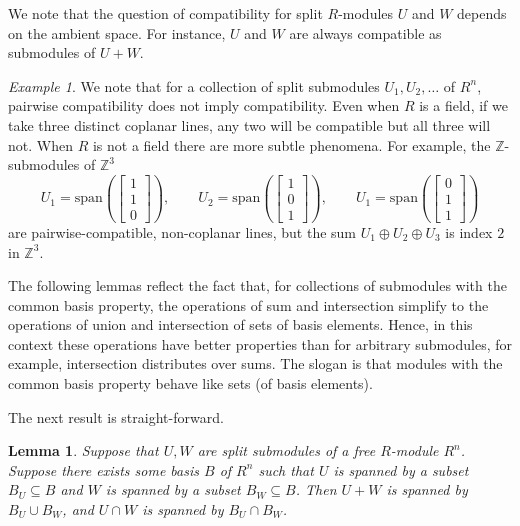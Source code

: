 \documentclass[a4paper]{amsart}
\newcommand{\Z}{\mathbb{Z}}
\numberwithin{theoremcounter}{section}
\newtheorem{lemma}[lemmaauto]{Lemma}
\theoremstyle{definition}
\theoremstyle{remark}
\newtheorem{example}[exampleauto]{Example}
\begin{document}
We note that the question of compatibility for split $R$-modules $U$ and $W$ depends on the ambient space. For instance, $U$ and $W$ are always compatible as submodules of $U+W$. 

\begin{example} We note that for a collection of split submodules $U_1, U_2, \dots$ of $R^n$, pairwise compatibility does not imply compatibility. Even when $R$ is a field, if we take three distinct coplanar lines, any two will be compatible but all three will not. When $R$ is not a field there are more subtle phenomena. For example, the $\Z$-submodules of $\Z^3$
$$ U_1 = \mathrm{span} \left( \begin{bmatrix} 1\\ 1 \\0  \end{bmatrix} \right),   \qquad U_2 = \mathrm{span} \left( \begin{bmatrix} 1\\0 \\1  \end{bmatrix} \right),  \qquad U_1 = \mathrm{span} \left( \begin{bmatrix} 0\\ 1 \\1  \end{bmatrix} \right)$$ 
are pairwise-compatible, non-coplanar lines, but the sum $U_1 \oplus U_2 \oplus U_3$ is index $2$ in $\Z^3$. 
\end{example} 

The following lemmas reflect the fact that, for collections of submodules with the common basis property, the operations of sum and intersection simplify to the operations of union and intersection of sets of basis elements. Hence, in this context these operations have better properties than for arbitrary submodules, for example, intersection distributes over sums. The slogan is that modules with the common basis property behave like sets (of basis elements).

The next result is straight-forward. 

\begin{lemma}  \label{CommonBasisIntersection} Suppose that $U, W$ are split submodules of a free $R$-module $R^n$. Suppose there exists some basis $B$ of $R^n$ such that $U$ is spanned by a subset $B_U \subseteq B$ and $W$ is spanned by a subset $B_W \subseteq B$. Then $U + W$ is spanned by $B_U \cup B_W$, and $U \cap W$ is spanned by $B_U \cap B_W$.
\end{lemma}
\end{document}
